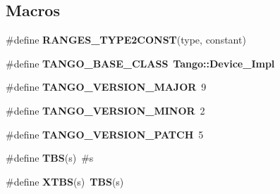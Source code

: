 \subsection*{Macros}
\begin{DoxyCompactItemize}
\item 
\#define {\bf R\-A\-N\-G\-E\-S\-\_\-\-T\-Y\-P\-E2\-C\-O\-N\-S\-T}(type, constant)
\item 
\#define {\bf T\-A\-N\-G\-O\-\_\-\-B\-A\-S\-E\-\_\-\-C\-L\-A\-S\-S}~{\bf Tango\-::\-Device\-\_\-Impl}
\item 
\#define {\bf T\-A\-N\-G\-O\-\_\-\-V\-E\-R\-S\-I\-O\-N\-\_\-\-M\-A\-J\-O\-R}~9
\item 
\#define {\bf T\-A\-N\-G\-O\-\_\-\-V\-E\-R\-S\-I\-O\-N\-\_\-\-M\-I\-N\-O\-R}~2
\item 
\#define {\bf T\-A\-N\-G\-O\-\_\-\-V\-E\-R\-S\-I\-O\-N\-\_\-\-P\-A\-T\-C\-H}~5
\item 
\#define {\bf T\-B\-S}(s)~\#s
\item 
\#define {\bf X\-T\-B\-S}(s)~{\bf T\-B\-S}(s)
\end{DoxyCompactItemize}

